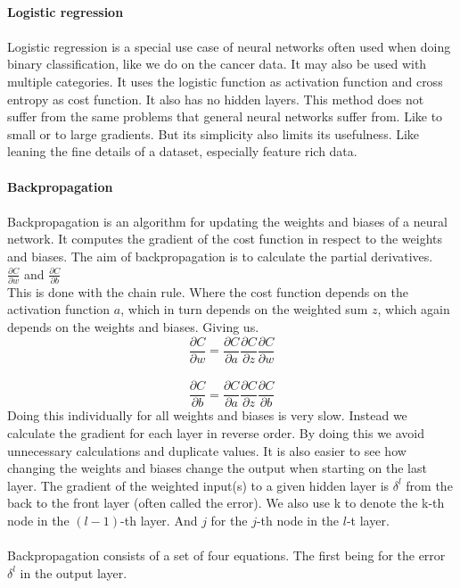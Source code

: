 \documentclass[12pt, letterpaper, twoside]{article}
\begin{document}
\ \\
\textbf{Logistic regression}\\
\ \\
Logistic regression is a special use case of neural networks often used when doing binary classification, like we do on the cancer data. It may also be used with multiple categories. It uses the logistic function as activation function and cross entropy as cost function. It also has no hidden layers.
This method does not suffer from the same problems that general neural networks suffer from. Like to small or to large gradients. But its simplicity also limits its usefulness. Like leaning the fine details of a dataset, especially feature rich data.\\
\newpage
\ \\
\textbf{Backpropagation}\\
\ \\
Backpropagation is an algorithm for updating the weights and biases of a neural network. It computes the gradient of the cost function in respect to the weights and biases. The aim of backpropagation is to calculate the partial derivatives. \\
$\frac{\partial C}{\partial w}$ and $\frac{\partial C}{\partial b}$\\
This is done with the chain rule. Where the cost function depends on the activation function $a$, which in turn depends on the weighted sum $z$, which again depends on the weights and biases. Giving us.\\
$$
\frac{\partial C}{\partial w} = \frac{\partial C}{\partial a}\frac{\partial C}{\partial z}\frac{\partial C}{\partial w}
$$
\ \\
$$
\frac{\partial C}{\partial b} = \frac{\partial C}{\partial a}\frac{\partial C}{\partial z}\frac{\partial C}{\partial b}
$$
Doing this individually for all weights and biases is very slow. Instead we calculate the gradient for each layer in reverse order. By doing this we avoid unnecessary calculations and duplicate values. It is also easier to see how changing the weights and biases change the output when starting on the last layer. The gradient of the weighted input(s) to a given hidden layer is $\delta^l$ from the back to the front layer (often called the error). We also use k to denote the k-th node in the $(l-1)$-th layer. And $j$ for the $j$-th node in the $l$-t layer.\\
\ \\
Backpropagation consists of a set of four equations. The first being for the error $\delta^l$ in the output layer.\\
\end{document}
